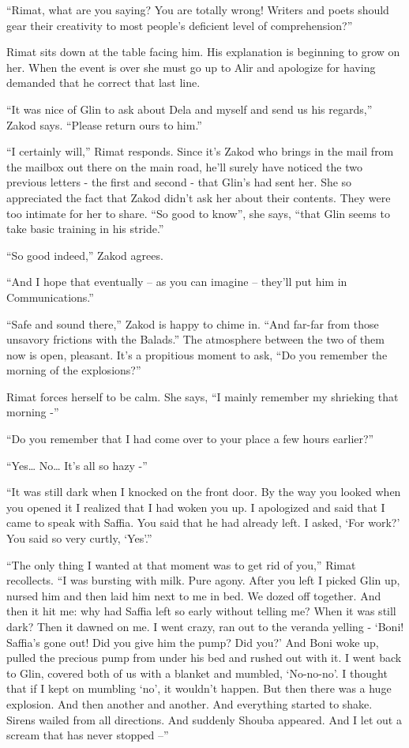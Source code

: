 \documentclass[twoside,11pt]{book}
\begin{document}
``Rimat, what are you saying? You are totally wrong! Writers and poets should gear their creativity to most
people's deficient level of comprehension?''

Rimat sits down at the table facing him. His explanation is beginning to grow on her. When the event is over she must go
up to Alir and apologize for having demanded that he correct that last line.

``It was nice of Glin to ask about Dela and myself and send us his
regards,'' Zakod says. ``Please return ours to him.''

``I certainly will,'' Rimat responds. Since it's Zakod who brings in the mail from the mailbox
out there on the main road, he'll surely have noticed the two previous letters - the first and second - that Glin's
had sent her. She so appreciated the fact that Zakod didn't ask her about their contents. They were too intimate for
her to share. ``So good to know'', she says, ``that Glin seems to take basic training in his
stride.''

``So good indeed,'' Zakod agrees.

``And I hope that eventually -- as you can imagine -- they'll put him in Communications.''

``Safe and sound there,'' Zakod is happy to chime in. ``And far-far from those
unsavory frictions with the Balads.'' The atmosphere between the two of them now is open, pleasant. It's a
propitious moment to ask, ``Do you remember the morning of the explosions?''

Rimat forces herself to be calm. She says, ``I mainly remember my shrieking that morning -''

``Do you remember that I had come over to your place a few hours earlier?''

``Yes{\dots} No{\ldots} It's all so hazy -''

``It was still dark when I knocked on the front door. By the way you looked when you opened it I realized
that I had woken you up. I apologized and said that I came to speak with Saffia. You said that he had already left. I
asked, `For work?' You said so very curtly, `Yes'.''

``The only thing I wanted at that moment was to get rid of
you,'' Rimat recollects. ``I was bursting with milk. Pure agony.  After you left I picked
Glin up, nursed him and then laid him next to me in bed. We dozed off together. And then it hit me:
why had Saffia left so early without telling me? When it was still dark? Then it dawned on me. I went
crazy, ran out to the veranda yelling - `Boni! Saffia's gone out! Did you give him the pump? Did you?' And Boni woke
up, pulled the precious pump from under his bed and rushed out with it. I went back to Glin, covered both of us with a
blanket and mumbled, `No-no-no'. I thought that if I kept on mumbling `no', it wouldn't happen. But then there was a
huge explosion. And then another and another. And everything started to shake. Sirens wailed from all directions. And
suddenly Shouba appeared. And I let out a scream that has never stopped --''
\end{document}
